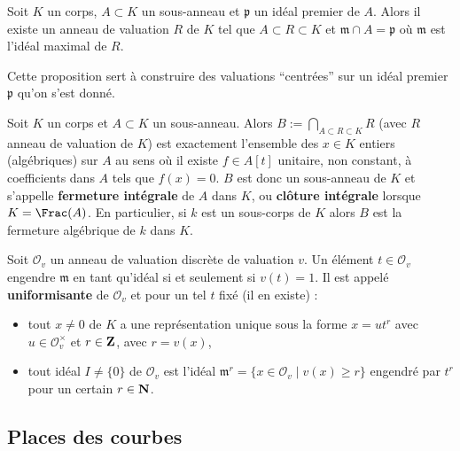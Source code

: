 	\begin{pop}
		Soit $K$ un corps, $A \subset K$ un sous-anneau et $\mathfrak{p}$ un idéal premier de $A$.
		Alors il existe un anneau de valuation $R$ de $K$ tel que $A \subset R \subset K$ et $\mathfrak{m} \cap A = \mathfrak{p}$ où $\mathfrak{m}$ est l'idéal maximal de $R$.
	\end{pop}

	Cette proposition sert à construire des valuations “centrées” sur un idéal premier $\mathfrak{p}$ qu'on s'est donné.
	
	\begin{pop}
		Soit $K$ un corps et $A \subset K$ un sous-anneau.
		Alors $B := \bigcap_{A \subset R \subset K} R$ (avec $R$ anneau de valuation de $K$) est exactement l'ensemble des $x \in K$ entiers (algébriques) sur $A$ au sens où il existe $f \in A[t]$ unitaire, non constant, à coefficients dans $A$ tels que $f(x) = 0$.
		$B$ est donc un sous-anneau de $K$ et s'appelle \textbf{fermeture intégrale} de $A$ dans $K$, ou \textbf{clôture intégrale} lorsque $K = \Frac(A)$.
		En particulier, si $k$ est un sous-corps de $K$ alors $B$ est la fermeture algébrique de $k$ dans $K$.
	\end{pop}

	\begin{pop}
		Soit $\mathcal{O}_v$ un anneau de valuation discrète de valuation $v$.
		Un élément $t \in \mathcal{O}_v$ engendre $\mathfrak{m}$ en tant qu'idéal si et seulement si $v(t) = 1$.
		Il est appelé \textbf{uniformisante} de $\mathcal{O}_v$ et pour un tel $t$ fixé (il en existe) :
		\begin{itemize}
			\item[\textbullet] tout $x \neq 0$ de $K$ a une représentation unique sous la forme $x = u t^r$ avec $u \in \mathcal{O}_v^\times$ et $r \in \mathbf{Z}$, avec $r = v(x)$,
			\item[\textbullet] tout idéal $I \neq \{ 0 \}$ de $\mathcal{O}_v$ est l'idéal $\mathfrak{m}^r = \{ x \in \mathcal{O}_v \mid v(x) \geq r \}$ engendré par $t^r$ pour un certain $r \in \mathbf{N}$.
		\end{itemize}
	\end{pop}


\subsection{Places des courbes}

